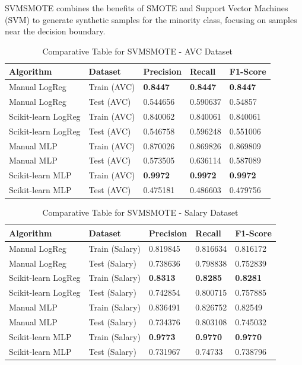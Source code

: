 \documentclass[a4paper,12pt]{article}
\begin{document}
SVMSMOTE combines the benefits of SMOTE and Support Vector Machines (SVM) to generate synthetic samples for the minority class, focusing on samples near the decision boundary.

\begin{table}[h!]
    \centering
    \caption{Comparative Table for SVMSMOTE - AVC Dataset}
    \begin{tabularx}{\textwidth}{|l|l|X|X|X|}
    \hline
    \textbf{Algorithm} & \textbf{Dataset} & \textbf{Precision} & \textbf{Recall} & \textbf{F1-Score} \\
    \hline
    Manual LogReg & Train (AVC) & \textbf{0.8447} & \textbf{0.8447} & \textbf{0.8447} \\
    Manual LogReg & Test (AVC) & 0.544656 & 0.590637 & 0.54857 \\
    Scikit-learn LogReg & Train (AVC) & 0.840062 & 0.840061 & 0.840061 \\
    Scikit-learn LogReg & Test (AVC) & 0.546758 & 0.596248 & 0.551006 \\
    Manual MLP & Train (AVC) & 0.870026 & 0.869826 & 0.869809 \\
    Manual MLP & Test (AVC) & 0.573505 & 0.636114 & 0.587089 \\
    Scikit-learn MLP & Train (AVC) & \textbf{0.9972} & \textbf{0.9972} & \textbf{0.9972} \\
    Scikit-learn MLP & Test (AVC) & 0.475181 & 0.486603 & 0.479756 \\
    \hline
    \end{tabularx}
\end{table}

\begin{table}[h!]
    \centering
    \caption{Comparative Table for SVMSMOTE - Salary Dataset}
    \begin{tabularx}{\textwidth}{|l|l|X|X|X|}
    \hline
    \textbf{Algorithm} & \textbf{Dataset} & \textbf{Precision} & \textbf{Recall} & \textbf{F1-Score} \\
    \hline
    Manual LogReg & Train (Salary) & 0.819845 & 0.816634 & 0.816172 \\
    Manual LogReg & Test (Salary) & 0.738636 & 0.798838 & 0.752839 \\
    Scikit-learn LogReg & Train (Salary) & \textbf{0.8313} & \textbf{0.8285} & \textbf{0.8281} \\
    Scikit-learn LogReg & Test (Salary) & 0.742854 & 0.800715 & 0.757885 \\
    Manual MLP & Train (Salary) & 0.836491 & 0.826752 & 0.82549 \\
    Manual MLP & Test (Salary) & 0.734376 & 0.803108 & 0.745032 \\
    Scikit-learn MLP & Train (Salary) & \textbf{0.9773} & \textbf{0.9770} & \textbf{0.9770} \\
    Scikit-learn MLP & Test (Salary) & 0.731967 & 0.74733 & 0.738796 \\
    \hline
    \end{tabularx}
\end{table}
\end{document}
